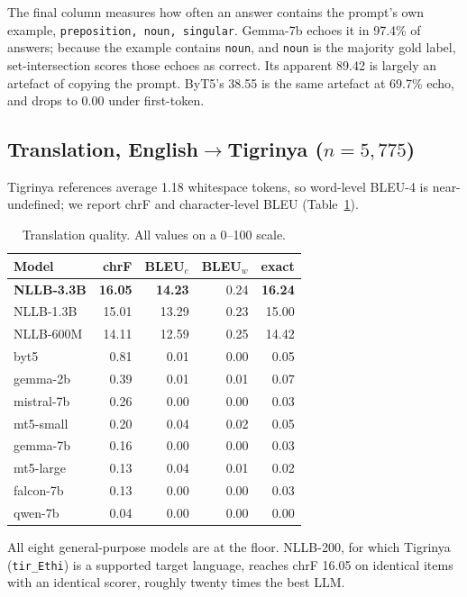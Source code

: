 \documentclass[11pt]{article}
\begin{document}
The final column measures how often an answer contains the prompt's own
example, \texttt{preposition, noun, singular}. Gemma-7b echoes it in 97.4\% of
answers; because the example contains \texttt{noun}, and \texttt{noun} is the
majority gold label, set-intersection scores those echoes as correct. Its
apparent 89.42 is largely an artefact of copying the prompt. ByT5's 38.55 is
the same artefact at 69.7\% echo, and drops to 0.00 under first-token.

\subsection{Translation, English$\rightarrow$Tigrinya ($n = 5{,}775$)}
\label{subsec:translation}

Tigrinya references average 1.18 whitespace tokens, so word-level BLEU-4 is
near-undefined; we report chrF and character-level BLEU
(Table~\ref{tab:translation}).

\begin{table}[tb]
\centering
\setlength{\tabcolsep}{4pt}
\begin{tabular}{lrrrr}
\toprule
Model & chrF & BLEU$_c$ & BLEU$_w$ & exact \\
\midrule
\textbf{NLLB-3.3B}  & \textbf{16.05} & \textbf{14.23} & 0.24 & \textbf{16.24} \\
NLLB-1.3B           & 15.01 & 13.29 & 0.23 & 15.00 \\
NLLB-600M           & 14.11 & 12.59 & 0.25 & 14.42 \\
\midrule
byt5       & 0.81 & 0.01 & 0.00 & 0.05 \\
gemma-2b   & 0.39 & 0.01 & 0.01 & 0.07 \\
mistral-7b & 0.26 & 0.00 & 0.00 & 0.03 \\
mt5-small  & 0.20 & 0.04 & 0.02 & 0.05 \\
gemma-7b   & 0.16 & 0.00 & 0.00 & 0.03 \\
mt5-large  & 0.13 & 0.04 & 0.01 & 0.02 \\
falcon-7b  & 0.13 & 0.00 & 0.00 & 0.03 \\
qwen-7b    & 0.04 & 0.00 & 0.00 & 0.00 \\
\bottomrule
\end{tabular}
\caption{Translation quality. All values on a 0--100 scale.}
\label{tab:translation}
\end{table}

All eight general-purpose models are at the floor. NLLB-200, for which
Tigrinya (\texttt{tir\_Ethi}) is a supported target language, reaches chrF
16.05 on identical items with an identical scorer, roughly twenty times the
best LLM.
\end{document}
